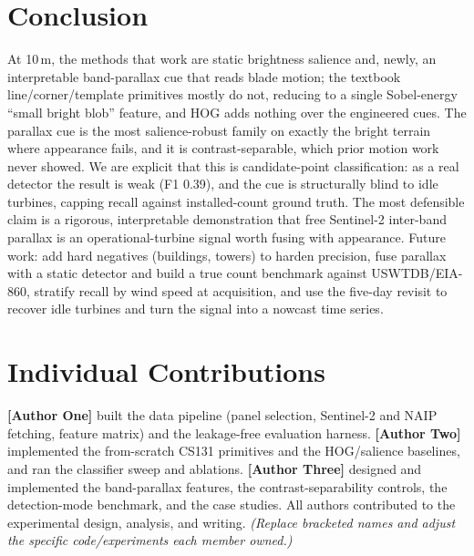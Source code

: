 \documentclass[10pt,twocolumn,letterpaper]{article}
\begin{document}
\section{Conclusion}
At 10\,m, the methods that work are static brightness salience and, newly, an interpretable band-parallax cue that reads blade motion; the textbook line/corner/template primitives mostly do not, reducing to a single Sobel-energy ``small bright blob'' feature, and HOG adds nothing over the engineered cues. The parallax cue is the most salience-robust family on exactly the bright terrain where appearance fails, and it is contrast-separable, which prior motion work never showed. We are explicit that this is candidate-point classification: as a real detector the result is weak (F1 0.39), and the cue is structurally blind to idle turbines, capping recall against installed-count ground truth. The most defensible claim is a rigorous, interpretable demonstration that free Sentinel-2 inter-band parallax is an operational-turbine signal worth fusing with appearance. Future work: add hard negatives (buildings, towers) to harden precision, fuse parallax with a static detector and build a true count benchmark against USWTDB/EIA-860, stratify recall by wind speed at acquisition, and use the five-day revisit to recover idle turbines and turn the signal into a nowcast time series.

\section{Individual Contributions}
\textbf{[Author One]} built the data pipeline (panel selection, Sentinel-2 and NAIP fetching, feature matrix) and the leakage-free evaluation harness. \textbf{[Author Two]} implemented the from-scratch CS131 primitives and the HOG/salience baselines, and ran the classifier sweep and ablations. \textbf{[Author Three]} designed and implemented the band-parallax features, the contrast-separability controls, the detection-mode benchmark, and the case studies. All authors contributed to the experimental design, analysis, and writing. \emph{(Replace bracketed names and adjust the specific code/experiments each member owned.)}
\end{document}
